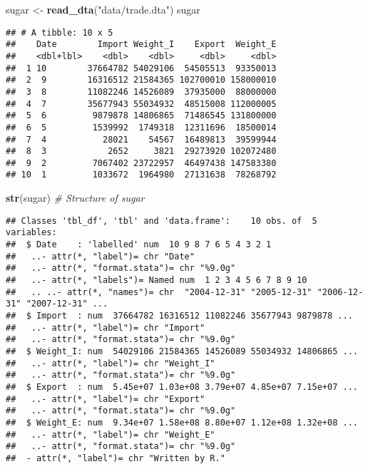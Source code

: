 \documentclass[]{article}
\newenvironment{Shaded}{\begin{snugshade}}{\end{snugshade}}
\newcommand{\KeywordTok}[1]{\textcolor[rgb]{0.13,0.29,0.53}{\textbf{#1}}}
\newcommand{\StringTok}[1]{\textcolor[rgb]{0.31,0.60,0.02}{#1}}
\newcommand{\CommentTok}[1]{\textcolor[rgb]{0.56,0.35,0.01}{\textit{#1}}}
\newcommand{\NormalTok}[1]{#1}
\begin{document}
\begin{Shaded}
\begin{Highlighting}[]
\NormalTok{sugar <-}\StringTok{ }\KeywordTok{read_dta}\NormalTok{(}\StringTok{"data/trade.dta"}\NormalTok{)}
\NormalTok{sugar}
\end{Highlighting}
\end{Shaded}

\begin{verbatim}
## # A tibble: 10 x 5
##    Date        Import Weight_I    Export  Weight_E
##    <dbl+lbl>    <dbl>    <dbl>     <dbl>     <dbl>
##  1 10        37664782 54029106  54505513  93350013
##  2  9        16316512 21584365 102700010 158000010
##  3  8        11082246 14526089  37935000  88000000
##  4  7        35677943 55034932  48515008 112000005
##  5  6         9879878 14806865  71486545 131800000
##  6  5         1539992  1749318  12311696  18500014
##  7  4           28021    54567  16489813  39599944
##  8  3            2652     3821  29273920 102072480
##  9  2         7067402 23722957  46497438 147583380
## 10  1         1033672  1964980  27131638  78268792
\end{verbatim}

\begin{Shaded}
\begin{Highlighting}[]
\KeywordTok{str}\NormalTok{(sugar) }\CommentTok{# Structure of sugar}
\end{Highlighting}
\end{Shaded}

\begin{verbatim}
## Classes 'tbl_df', 'tbl' and 'data.frame':    10 obs. of  5 variables:
##  $ Date    : 'labelled' num  10 9 8 7 6 5 4 3 2 1
##   ..- attr(*, "label")= chr "Date"
##   ..- attr(*, "format.stata")= chr "%9.0g"
##   ..- attr(*, "labels")= Named num  1 2 3 4 5 6 7 8 9 10
##   .. ..- attr(*, "names")= chr  "2004-12-31" "2005-12-31" "2006-12-31" "2007-12-31" ...
##  $ Import  : num  37664782 16316512 11082246 35677943 9879878 ...
##   ..- attr(*, "label")= chr "Import"
##   ..- attr(*, "format.stata")= chr "%9.0g"
##  $ Weight_I: num  54029106 21584365 14526089 55034932 14806865 ...
##   ..- attr(*, "label")= chr "Weight_I"
##   ..- attr(*, "format.stata")= chr "%9.0g"
##  $ Export  : num  5.45e+07 1.03e+08 3.79e+07 4.85e+07 7.15e+07 ...
##   ..- attr(*, "label")= chr "Export"
##   ..- attr(*, "format.stata")= chr "%9.0g"
##  $ Weight_E: num  9.34e+07 1.58e+08 8.80e+07 1.12e+08 1.32e+08 ...
##   ..- attr(*, "label")= chr "Weight_E"
##   ..- attr(*, "format.stata")= chr "%9.0g"
##  - attr(*, "label")= chr "Written by R."
\end{verbatim}
\end{document}
